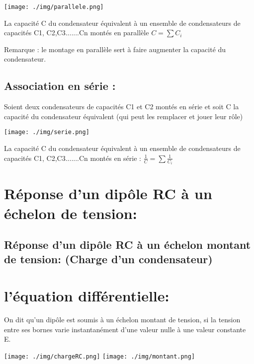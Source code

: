 \documentclass[12pt]{article}
\begin{document}
\begin{center}
	\texttt{[image: ./img/parallele.png]}
\end{center}





La capacité C du condensateur équivalent à un ensemble de condensateurs de capacités C1, C2,C3.......Cn montés en parallèle $C=\sum C_i$

Remarque : le montage en parallèle sert à faire augmenter la capacité du condensateur.

\subsection{Association en série : }
Soient deux condensateurs de capacités C1 et C2 montés en série et soit C la capacité du condensateur équivalent (qui peut les remplacer et jouer leur rôle)


\begin{center}
	\texttt{[image: ./img/serie.png]}
\end{center}


La capacité C du condensateur équivalent à un ensemble de condensateurs de capacités C1, C2,C3.......Cn montés en série : $\frac{1}{C} = \sum \frac{1}{C_i}$

\section{Réponse d'un dipôle  RC à un échelon de tension: }

\subsection{Réponse d'un dipôle  RC à un échelon montant de tension: (Charge d'un condensateur) }
\section*{l'équation différentielle:  }
On dit qu'un dipôle est soumis à un échelon montant de tension, si la tension entre ses bornes varie instantanément d'une valeur
nulle à une valeur constante E.


\begin{center}
	\texttt{[image: ./img/chargeRC.png]}
	\texttt{[image: ./img/montant.png]}
\end{center}
\end{document}
